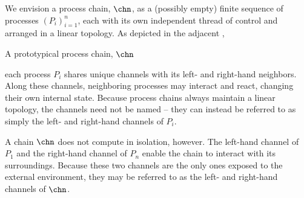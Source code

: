 We envision a process chain, $\chn$, as a (possibly empty) finite sequence of processes $(P_i)_{i=1}^{n}$, each with its own independent thread of control and arranged in a linear topology.
As depicted in the adjacent ,%
%
\begin{marginfigure}
  \centering
  \caption{A prototypical process chain, $\chn$}\label{fig:singleton-processes:chain-topology}
\end{marginfigure}
%
each process $P_i$ shares unique channels with its left- and right-hand neighbors.
Along these channels, neighboring processes may interact and react, changing their own internal state.
Because process chains always maintain a linear topology, the channels need not be named -- they can instead be referred to as simply the left- and right-hand channels of $P_i$.

A chain $\chn$ does not compute in isolation, however.
The left-hand channel of $P_1$ and the right-hand channel of $P_n$ enable the chain to interact with its surroundings.
Because these two channels are the only ones exposed to the external environment, they may be referred to as the left- and right-hand channels of $\chn$.

